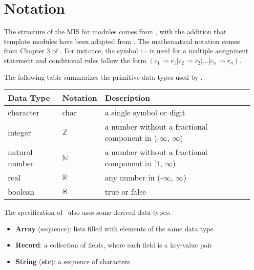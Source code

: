 \documentclass[12pt, titlepage]{article}
\begin{document}
\section{Notation}


The structure of the MIS for modules comes from \citet{HoffmanAndStrooper1995},
with the addition that template modules have been adapted from
\cite{GhezziEtAl2003}.  The mathematical notation comes from Chapter 3 of
\citet{HoffmanAndStrooper1995}.  For instance, the symbol := is used for a
multiple assignment statement and conditional rules follow the form $(c_1
\Rightarrow r_1 | c_2 \Rightarrow r_2 | ... | c_n \Rightarrow r_n )$.

The following table summarizes the primitive data types used by \progname. 

\begin{center}
\renewcommand{\arraystretch}{1.2}
\noindent 
\begin{tabular}{l l p{7.5cm}} 
\toprule 
\textbf{Data Type} & \textbf{Notation} & \textbf{Description}\\ 
\midrule
character & char & a single symbol or digit\\
integer & $\mathbb{Z}$ & a number without a fractional component in (-$\infty$, $\infty$) \\
natural number & $\mathbb{N}$ & a number without a fractional component in [1, $\infty$) \\
real & $\mathbb{R}$ & any number in (-$\infty$, $\infty$)\\
boolean & $\mathbb{B}$ & true or false \\
\bottomrule
\end{tabular} 
\end{center}

\noindent
The specification of \progname \ also uses some derived data types: 
\begin{itemize}
  \item \textbf{Array} (sequence): lists filled with elements of the same data type
  \item \textbf{Record}: a collection of fields, where each field is a key-value pair
  \item \textbf{String} (\textbf{str}): a sequence of characters 
\end{itemize}
\end{document}
